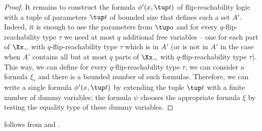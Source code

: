 \begin{proof}
    It remains to construct the formula $\phi'(x, \tup t)$ of flip-reachability logic with a tuple of parameters $\tup t$ of bounded size that defines such a set $A'$.
    Indeed, it is enough to use the parameters from $\tup a$ and for every $q$-flip-reachability type $\tau$ we need at most $q$ additional free variables -- one for each part of $\Xx_{\sim}$ with $q$-flip-reachability type $\tau$ which is in $A'$ (or is not in $A'$ in the case when $A'$ contains all but at most $q$ parts of $\Xx_{\sim}$ with $q$-flip-reachability type $\tau$).
    This way, we can define for every $q$-flip-reachability type $\tau$, we can consider a formula $\xi_\tau$ and there is a bounded number of such formulas.
    Therefore, we can write a single formula $\phi'(x, \tup t)$ by extending the tuple $\tup t$ with a finite number of dummy variables; the formula $\psi$ chooses the appropriate formula $\xi$ by testing the equality type of these dummy variables.   
\end{proof}

 follows from  and .
